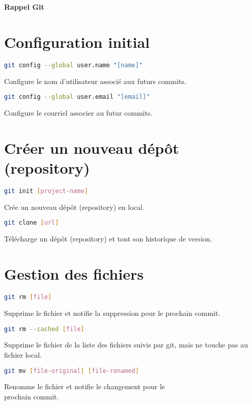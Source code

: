 \documentclass[10pt,landscape]{article}
\begin{document}
\raggedright
\footnotesize
\begin{multicols}{3}


\setlength{\premulticols}{1pt}
\setlength{\postmulticols}{1pt}
\setlength{\multicolsep}{1pt}
\setlength{\columnsep}{2pt}

\begin{center}
     \Large{\textbf{Rappel Git}} \\
\end{center}

\section{Configuration initial}
\begin{lstlisting}[language=bash]
git config --global user.name "[name]"
\end{lstlisting}
Configure le nom d’utilisateur associé aux futurs commits.
\begin{lstlisting}[language=bash]
git config --global user.email "[email]"
\end{lstlisting}
Configure le courriel associer au futur commits.


\section{Créer un nouveau dépôt (repository)}
\begin{lstlisting}[language=bash]
git init [project-name]
\end{lstlisting}
Crée un nouveau dépôt (repository) en local.\\
\begin{lstlisting}[language=bash]
git clone [url]
\end{lstlisting}
Télécharge un dépôt (repository) et tout son historique de version.


\section{Gestion des fichiers}
\begin{lstlisting}[language=bash]
git rm [file]
\end{lstlisting}
Supprime le fichier et notifie la suppression pour le prochain commit.\\
\begin{lstlisting}[language=bash]
git rm --cached [file]
\end{lstlisting}
Supprime le fichier de la liste des fichiers suivis par git, mais ne touche pas au fichier local.\\
\begin{lstlisting}[language=bash]
git mv [file-original] [file-renamed]
\end{lstlisting}
Renomme le fichier et notifie le changement pour le\\
prochain commit.


\end{multicols}
\end{document}
